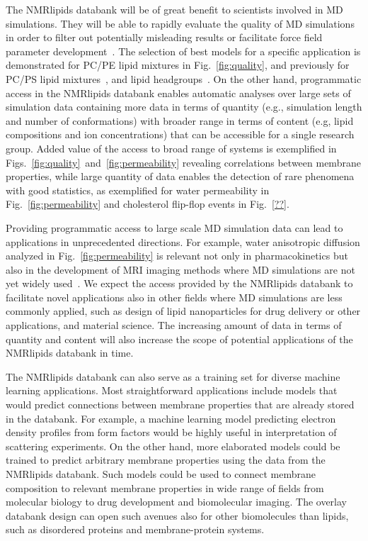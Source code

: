 \documentclass[fleqn,10pt]{wlscirep}
\begin{document}
The NMRlipids databank will be of great benefit to scientists involved in MD simulations. They will be able to rapidly evaluate the quality of MD simulations in order to filter out potentially misleading results or facilitate force field parameter development~\cite{antila22b}. The selection of best models for a specific application is demonstrated for PC/PE lipid mixtures in Fig.~\ref{fig:quality}, and previously for PC/PS lipid mixtures~\cite{antila22b}, and lipid headgroups~\cite{bacle21}. On the other hand, programmatic access in the NMRlipids databank enables automatic analyses over large sets of simulation data containing more data in terms of quantity (e.g., simulation length and number of conformations) with broader range in terms of content (e.g, lipid compositions and ion concentrations) that can be accessible for a single research group. Added value of the access to broad range of systems is exemplified in Figs.~\ref{fig:quality}~and~\ref{fig:permeability} revealing correlations between membrane properties, while large quantity of data enables the detection of rare phenomena with good statistics, as exemplified for water permeability in Fig.~\ref{fig:permeability} and cholesterol flip-flop events in Fig.~\ref{??}. 

Providing programmatic access to large scale MD simulation data can lead to applications in unprecedented directions. For example, water anisotropic diffusion analyzed in Fig.~\ref{fig:permeability} is relevant not only in pharmacokinetics but also in the development of MRI imaging methods where MD simulations are not yet widely used~\cite{topgaard20}. We expect the access provided by the NMRlipids databank to facilitate novel applications also in other fields where MD simulations are less commonly applied, such as design of lipid nanoparticles for drug delivery or other applications, and material science. The increasing amount of data in terms of quantity and content will also increase the scope of potential applications of the NMRlipids databank in time.

The NMRlipids databank can also serve as a training set for diverse machine learning applications. Most straightforward applications include models that would predict connections between membrane properties that are already stored in the databank. For example, a machine learning model predicting electron density profiles from form factors would be highly useful in interpretation of scattering experiments. On the other hand, more elaborated models could be trained to predict arbitrary membrane properties using the data from the NMRlipids databank. Such models could be used to connect membrane composition to relevant membrane properties in wide range of fields from molecular biology to drug development and biomolecular imaging. The overlay databank design can open such avenues also for other biomolecules than lipids, such as disordered proteins and membrane-protein systems.
\end{document}
